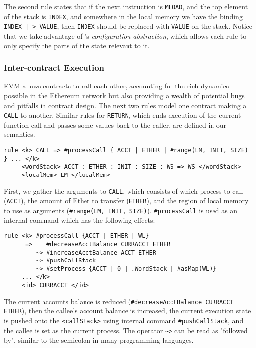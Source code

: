 The second rule states that if the next instruction is \texttt{MLOAD}, and the
top element of the stack is \texttt{INDEX}, and somewhere in the local memory we
have the binding \texttt{INDEX |-> VALUE}, then \texttt{INDEX} should be
replaced with \texttt{VALUE} on the stack. Notice that we take advantage of \K{}'s
\textit{configuration abstraction}, which allows each rule to only specify the
parts of the state relevant to it.

\subsubsection{Inter-contract Execution}

EVM allows contracts to call each other, accounting for the rich dynamics
possible in the Ethereum network but also providing a wealth of potential bugs
and pitfalls in contract design. The next two rules model one contract making a
\texttt{CALL} to another. Similar rules for \texttt{RETURN}, which ends
execution of the current function call and passes some values back to the
caller, are defined in our semantics.

\begin{verbatim}
rule <k> CALL => #processCall { ACCT | ETHER | #range(LM, INIT, SIZE) } ... </k>
     <wordStack> ACCT : ETHER : INIT : SIZE : WS => WS </wordStack>
     <localMem> LM </localMem>
\end{verbatim}

First, we gather the arguments to \texttt{CALL}, which consists of which process
to call (\texttt{ACCT}), the amount of Ether to transfer (\texttt{ETHER}), and
the region of local memory to use as arguments (\texttt{\#range(LM, INIT,
SIZE)}). \texttt{\#processCall} is used as an internal command which has the
following effects:

\begin{verbatim}
rule <k> #processCall {ACCT | ETHER | WL}
      =>    #decreaseAcctBalance CURRACCT ETHER
         ~> #increaseAcctBalance ACCT ETHER
         ~> #pushCallStack
         ~> #setProcess {ACCT | 0 | .WordStack | #asMap(WL)}
     ... </k>
     <id> CURRACCT </id>
\end{verbatim}

The current accounts balance is reduced (\texttt{\#decreaseAcctBalance CURRACCT
ETHER}), then the callee's account balance is increased, the current execution
state is pushed onto the \texttt{<callStack>} using internal command
\texttt{\#pushCallStack}, and the callee is set as the current process. The
operator \texttt{\textasciitilde >} can be read as "followed by", similar to the semicolon in many programming languages.
